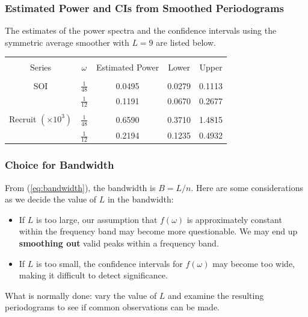\documentclass[%
xcolor=pdftex]{beamer}
\begin{document}
\begin{frame}
\frametitle{Estimated Power and CIs from Smoothed Periodograms}

The estimates of the power spectra and the confidence intervals using the symmetric average smoother with $L=9$ are listed below.

\begin{center}
\begin{tabular}{ccccc}
\hline \\
Series & $\omega$ & Estimated Power & Lower & Upper \\
\hline \\
SOI & $\frac{1}{48}$ & 0.0495 & 0.0279 & 0.1113\\
    & $\frac{1}{12}$ & 0.1191 & 0.0670 & 0.2677 \\
    \hline\\
Recruit $(\times 10^3)$ & $\frac{1}{48}$ & 0.6590 & 0.3710 & 1.4815 \\
                        & $\frac{1}{12}$ & 0.2194 & 0.1235 & 0.4932 \\
\hline
\end{tabular}
\end{center}

\end{frame}

\begin{frame}
\frametitle{Choice for Bandwidth}

From (\ref{eq:bandwidth}), the bandwidth is $B = L/n$. Here are some considerations as we decide the value of $L$ in the bandwidth:

\begin{itemize}

\item If $L$ is too large, our assumption that $f(\omega)$ is approximately constant within the frequency band may become more questionable. We may end up \textbf{smoothing out} valid peaks within a frequency band.

\item If $L$ is too small, the confidence intervals for $f(\omega)$ may become too wide, making it difficult to detect significance. 

\end{itemize}

What is normally done: vary the value of $L$ and examine the resulting periodograms to see if common observations can be made. 

\end{frame}
\end{document}

